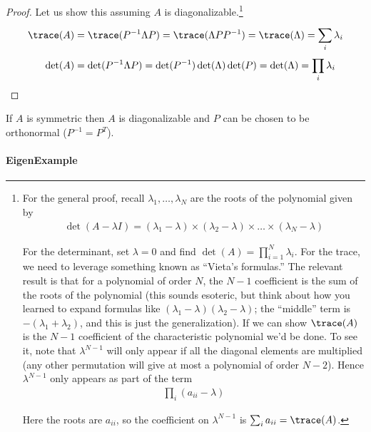 \documentclass{article}
\begin{document}
\begin{proof}
  Let us show this assuming $A$ is diagonalizable.\footnote{
    For the general proof, recall $\lambda_1, \ldots, \lambda_N$ are the roots of the polynomial given by
    \begin{align*}
      \det(A - \lambda I)
      =
      (\lambda_1 - \lambda)
      \times
      (\lambda_2 - \lambda)
      \times
      \ldots
      \times
      (\lambda_N - \lambda)
    \end{align*}

    For the determinant, set $\lambda = 0$ and find $\det(A) = \prod_{i = 1}^N \lambda_i$. For the trace, we need to leverage something known as ``Vieta's formulas.'' The relevant result is that for a polynomial of order $N$, the $N - 1$ coefficient is the sum of the roots of the polynomial (this sounds esoteric, but think about how you learned to expand formulas like $(\lambda_1 - \lambda) (\lambda_2 - \lambda)$; the ``middle'' term is $- (\lambda_1 + \lambda_2)$, and this is just the generalization). If we can show $\trace(A)$ is the $N - 1$ coefficient of the characteristic polynomial we'd be done. To see it, note that $\lambda^{N - 1}$ will only appear if all the diagonal elements are multiplied (any other permutation will give at most a polynomial of order $N - 2$). Hence $\lambda^{N - 1}$ only appears as part of the term
    \begin{align*}
      \prod_{i} (a_{ii} - \lambda)
    \end{align*}

    Here the roots are $a_{ii}$, so the coefficient on $\lambda^{N - 1}$ is $\sum^{}_{i} a_{ii} = \trace(A)$.
  }
  \begin{align*}
    \trace(A)
    &
    = \trace(P^{-1} \Lambda P)
    = \trace(\Lambda P P^{-1})
    = \trace(\Lambda)
    = \sum^{}_{i}  \lambda_i
    \\
    \det(A)
    &
    = \det(P^{-1} \Lambda P)
    = \det(P^{-1}) \det(\Lambda) \det(P)
    = \det(\Lambda)
    = \prod^{}_{i}  \lambda_i
  \end{align*}
\end{proof}

\begin{theorem}
  If $A$ is symmetric then $A$ is diagonalizable and $P$ can be chosen to be orthonormal ($P^{-1} = P^T$).
\end{theorem}

\paragraph{EigenExample}
\label{par:eigenexample}
\end{document}
